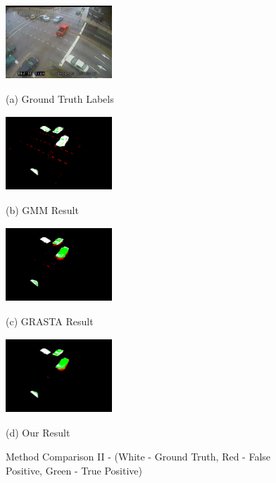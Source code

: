 \documentclass{article}
\begin{document}
\begin{figure}[t]
\centering
\begin{minipage}[b]{0.48\linewidth}
  \centering
  \centerline{\includegraphics[width=4cm, height=2.8cm]{Imgs/0412041242.jpg}}
  \centerline{(a) Ground Truth Labels}\medskip
\end{minipage}
\begin{minipage}[b]{0.48\linewidth}
  \centering
  \centerline{\includegraphics[width=4cm, height=2.8cm]{Imgs/0412041242_gmm_rwg.png}}
  \centerline{(b) GMM Result}\medskip
\end{minipage}

\begin{minipage}[b]{0.48\linewidth}
  \centering
  \centerline{\includegraphics[width=4cm, height =2.8cm]{Imgs/0412041242_grasta_rwg.png}}
  \centerline{(c) GRASTA Result}\medskip
\end{minipage}
\begin{minipage}[b]{0.48\linewidth}
  \centering
  \centerline{\includegraphics[width=4cm, height = 2.8cm]{Imgs/0412041242_rpca_rwg.png}}
  \centerline{(d) Our Result}\medskip
\end{minipage}

\caption{Method Comparison II - (White - Ground Truth, Red - False Positive, Green -  True Positive)}
\label{fig:methodComp2}
%
\end{figure}
\end{document}
